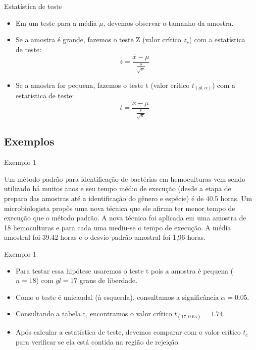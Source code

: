 \documentclass{beamer}
\begin{document}
\begin{frame}{Estatística de teste}
  \begin{itemize}
  \item Em um teste para a média $\mu$, devemos observar o tamanho da amostra.
  \item Se a amostra é grande, fazemos o teste Z (valor crítico $z_c$)
    com a estatística de teste:
    \begin{displaymath}
      z = \frac{\bar{x} - \mu}{\frac{s}{\sqrt{n}}}
    \end{displaymath}
  \item Se a amostra for pequena, fazemos o teste t (valor crítico
    $t_{(gl,\alpha)}$) com a estatística de teste:
    \begin{displaymath}
      t = \frac{\bar{x} - \mu}{\frac{s}{\sqrt{n}}}
    \end{displaymath}
  \end{itemize}
\end{frame}

\subsection{Exemplos}

\begin{frame}{Exemplo 1}
  \begin{example}
    Um método padrão para identificação de bactérias em hemoculturas
    vem sendo utilizado há muitos anos e seu tempo médio de execução
    (desde a etapa de preparo das amostras até a identificação do
    gênero e espécie) é de 40.5 horas. Um microbiologista propôs uma
    nova técnica que ele afirma ter menor tempo de execução que o
    método padrão. A nova técnica foi aplicada em uma amostra de 18
    hemoculturas e para cada uma mediu-se o tempo de execução. A média
    amostral foi 39.42 horas e o desvio padrão amostral foi 1,96
    horas.
  \end{example}
\end{frame}

\begin{frame}{Exemplo 1}
  \begin{itemize}
  \item Para testar essa hipótese usaremos o teste t pois a amostra é
    pequena ($n=18$) com \alert{$gl=17$} graus de liberdade.
  \item Como o teste é unicaudal (à esquerda), consultamos a
    significância $\alpha = 0.05$.
  \item Consultando a tabela t, encontramos o valor crítico
    \alert{$t_{(17,0.05)} = 1.74$}.
  \item Após calcular a estatística de teste, devemos comparar com o
    valor crítico $t_c$ para verificar se ela está contida na região
    de rejeição.
  \end{itemize}
\end{frame}
\end{document}
